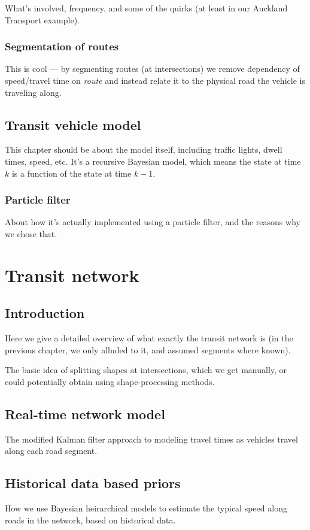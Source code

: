 \documentclass[english]{MastersDoctoralThesis}\usepackage[]{graphicx}\usepackage[]{color}
\begin{document}
What's involved, frequency, and some of the
quirks (at least in our Auckland Transport example).


\section{Segmentation of routes}

This is cool --- by segmenting routes
(at intersections) we remove dependency of
speed/travel time on \emph{route} and instead
relate it to the physical road the vehicle is traveling along.



\chapter{Transit vehicle model}

This chapter should be about the model itself,
including traffic lights, dwell times, speed, etc.
It's a recursive Bayesian model,
which means the state at time $k$ is a function
of the state at time $k-1$.

\section{Particle filter}

About how it's actually implemented using a particle filter,
and the reasons why we chose that.


\part{Transit network}



\chapter{Introduction}

Here we give a detailed overview of what exactly the
transit network is
(in the previous chapter, we only alluded to it,
and assumed segments where known).

The basic idea of splitting shapes at intersections,
which we get manually, or could potentially
obtain using shape-processing methods.



\chapter{Real-time network model}

The modified Kalman filter approach to modeling
travel times as vehicles travel along each
road segment.



\chapter{Historical data based priors}

How we use Bayesian heirarchical models to
estimate the typical speed along roads in the
network, based on historical data.


\appendix
\end{document}
